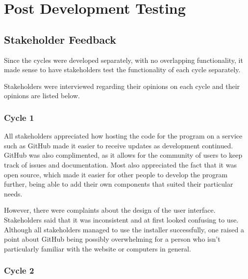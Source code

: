 \chapter{Post Development Testing}

    \section{Stakeholder Feedback}

        Since the cycles were developed separately, with no overlapping functionality, it made sense to have stakeholders test the functionality of each cycle separately. 

        Stakeholders were interviewed regarding their opinions on each cycle and their opinions are listed below.

        \subsection{Cycle 1}

            All stakeholders appreciated how hosting the code for the program on a service such as GitHub made it easier to receive updates as development continued. 
            GitHub was also complimented, as it allows for the community of users to keep track of issues and documentation. 
            Most also appreciated the fact that it was open source, which made it easier for other people to develop the program further, being able to add their own components that suited their particular needs. 

            However, there were complaints about the design of the user interface. Stakeholders said that it was inconsistent and at first looked confusing to use. 
            Although all stakeholders managed to use the installer successfully, one raised a point about GitHub being possibly overwhelming for a person who isn't particularly familiar with the website or computers in general. 


        \subsection{Cycle 2}

